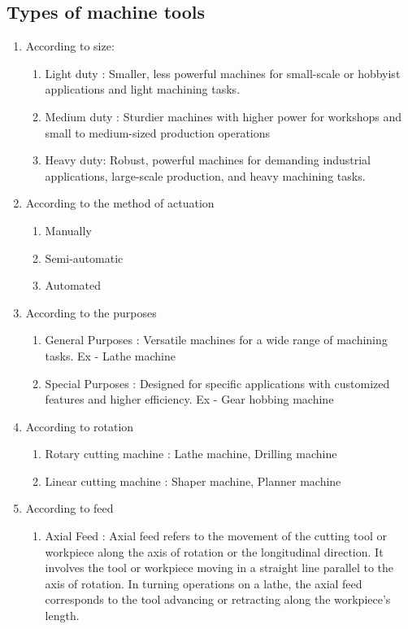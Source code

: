 \documentclass{article}
\begin{document}
\subsection*{Types of machine tools}
\begin{enumerate}
  \item According to size:
    \begin{enumerate}
      \item Light duty :  Smaller, less powerful machines for small-scale or hobbyist applications and light machining tasks. 
      \item Medium duty : Sturdier machines with higher power for workshops and small to medium-sized production operations
      \item Heavy duty:  Robust, powerful machines for demanding industrial applications, large-scale production, and heavy machining tasks.
    \end{enumerate}
  \item According to the method of actuation 
    \begin{enumerate}
      \item Manually 
      \item Semi-automatic 
      \item Automated
    \end{enumerate}
  \item According to the purposes 
    \begin{enumerate}
      \item General Purposes : Versatile machines for a wide range of machining tasks. Ex - Lathe machine 
      \item Special Purposes : Designed for specific applications with customized features and higher efficiency. Ex - Gear hobbing machine 
    \end{enumerate}
  \item According to rotation 
    \begin{enumerate}
      \item Rotary cutting machine : Lathe machine, Drilling machine 
      \item Linear cutting machine : Shaper machine, Planner machine 
    \end{enumerate}
  \item According to feed  
    \begin{enumerate}
      \item Axial Feed : Axial feed refers to the movement of the cutting tool or workpiece along the axis of rotation or the longitudinal direction. It involves the tool or workpiece moving in a straight line parallel to the axis of rotation. In turning operations on a lathe, the axial feed corresponds to the tool advancing or retracting along the workpiece's length.

\end{enumerate}
\end{enumerate}
\end{document}
